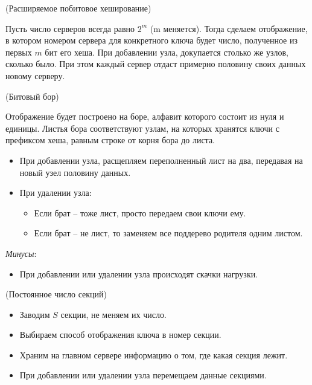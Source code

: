 \begin{algorithm}(Расширяемое побитовое хеширование)

    Пусть число серверов всегда равно $2^m$ (m меняется). Тогда
    сделаем отображение, в котором номером сервера для конкретного ключа
    будет число, полученное из первых $m$ бит его хеша. При добавлении узла,
    докупается столько же узлов, сколько было. При этом каждый сервер отдаст
    примерно половину своих данных новому серверу.
\end{algorithm}

\begin{algorithm}(Битовый бор)

    Отображение будет построено на боре, алфавит которого состоит из нуля и
    единицы. Листья бора соответствуют узлам, на которых хранятся ключи с
    префиксом хеша, равным строке от корня бора до листа.
    \begin{itemize}
        \item При добавлении узла, расщепляем переполненный лист на два,
            передавая на новый узел половину данных.
        \item При удалении узла:
            \begin{itemize}
                \item Если брат -- тоже лист, просто передаем свои ключи ему.
                \item Если брат -- не лист, то заменяем все поддерево родителя
                    одним листом.
            \end{itemize}
    \end{itemize}
    \textit{Минусы}:
    \begin{itemize}
        \item При добавлении или удалении узла происходят скачки нагрузки.
    \end{itemize}
\end{algorithm}

\begin{algorithm}(Постоянное число секций)

    \begin{itemize}
        \item Заводим $S$ секции, не меняем их число.
        \item Выбираем способ отображения ключа в номер секции.
        \item Храним на главном сервере информацию о том, где какая секция лежит.
        \item При добавлении или удалении узла перемещаем данные секциями.
    \end{itemize}
\end{algorithm}

